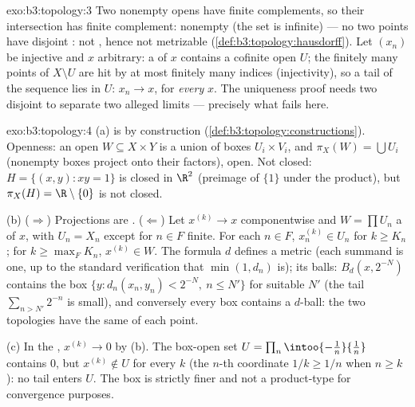 \begin{solution}{exo:b3:topology:3}
Two nonempty opens have finite complements, so their
intersection has finite complement: nonempty (the set is
infinite) --- no two points have disjoint : not
, hence not metrizable
(\cref{def:b3:topology:hausdorff}). Let $(x_n)$ be injective and
$x$ arbitrary: a  of $x$ contains a cofinite open
$U$; the finitely many points of $X\setminus U$ are hit by at
most finitely many indices (injectivity), so a tail of the
sequence lies in $U$: $x_n \to x$, for \emph{every} $x$. The
uniqueness proof needs two disjoint  to separate
two alleged limits --- precisely what fails here.
\end{solution}

\begin{solution}{exo:b3:topology:4}
(a)  is by construction
(\cref{def:b3:topology:constructions}). Openness: an open $W
\subseteq X \times Y$ is a union of boxes $U_i\times V_i$, and
$\pi_X(W) = \bigcup U_i$ (nonempty boxes project onto their
factors), open. Not closed: $H = \{(x,y) : xy = 1\}$ is closed
in $\R^2$ (preimage of $\{1\}$ under the  product),
but $\pi_X(H) = \R\setminus\{0\}$ is not closed.

(b) ($\Rightarrow$) Projections are . ($\Leftarrow$)
Let $x^{(k)} \to x$ componentwise and $W = \prod U_n$ a 
 of $x$, with $U_n = X_n$ except for $n \in F$
finite. For each $n \in F$, $x_n^{(k)} \in U_n$ for $k \geq
K_n$; for $k \geq \max_F K_n$, $x^{(k)} \in W$. The formula $d$
defines a metric (each summand is one, up to the standard
verification that $\min(1, d_n)$ is); its balls: $B_d(x,
2^{-N})$ contains the  box $\{y : d_n(x_n,y_n) < 2^{-N},\
n \leq N'\}$ for suitable $N'$ (the tail $\sum_{n > N'} 2^{-n}$
is small), and conversely every  box contains a $d$-ball:
the two topologies have the same \omterm{def:b3:topology:topology}{neighborhoods} of each point.

(c) In the , $x^{(k)} \to 0$ by (b). The box-open
set $U = \prod_n \intoo{-\tfrac1n}{\tfrac1n}$ contains $0$, but
$x^{(k)} \notin U$ for every $k$ (the $n$-th coordinate $1/k
\geq 1/n$ when $n \geq k$): no tail enters $U$. The box 
is strictly finer and not a product-type \omterm{def:b3:topology:topology}{topology} for
convergence purposes.
\end{solution}

